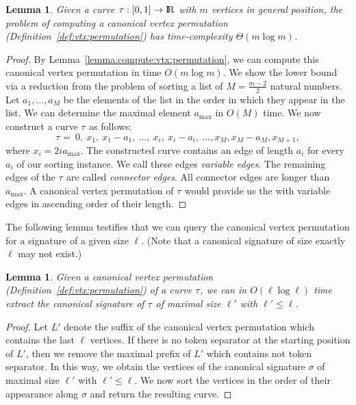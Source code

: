 \documentclass[11pt, letter]{article}
\newtheorem{lemma}[theorem]{Lemma}
\newcommand{\lemlab}[1]{\label{lemma:#1}}
\newcommand{\lemref}[1]{Lemma~\ref{lemma:#1}}
\newcommand{\defref}[1]{Definition~\ref{def:#1}}
\renewcommand{\Re}{{\rm I\!\hspace{-0.025em} R}}
\newcommand{\trajectory}[2]{\ensuremath{{#1}_{#2}}}
\newcommand{\inputSym}{\ensuremath{\tau}}
\newcommand{\inputTraj}[1]{\trajectory{\inputSym}{#1}}
\begin{document}
\begin{lemma}\lemlab{lb:vtx:permutation}
Given a curve $\tau:[0,1]\rightarrow\Re$ with $m$ vertices
in general position, the problem of computing a canonical vertex permutation (\defref{vtx:permutation}) has time-complexity $\Theta(m\log m)$.
\end{lemma}
\begin{proof}
By \lemref{compute:vtx:permutation}, we can compute this canonical vertex permutation in time $O(m \log m)$.  We show the lower bound via a reduction from the problem of sorting a list of $M=\frac{m-2}{2}$ natural numbers. Let $a_1,\dots,a_{M}$ be the elements of the list in the order in which they appear in the list. We can determine the maximal element $a_{\max}$ in $O(M)$ time. We now construct a curve $\inputTraj{}$ as follows: \[ \inputTraj{} =~ 0,~  x_1,~ x_1-a_1,~ \dots,~ x_i,~ x_i-a_i,~ \dots, x_M, x_M-a_M, x_{M+1},  \] where $x_i=2ia_{\max}$. The constructed curve contains an edge of length $a_i$ for every $a_i$ of our sorting instance. We call these edges \emph{variable edges}. The remaining edges of the $\inputTraj{}$ are called \emph{connector edges}. All connector edges are longer than $a_{\max}$. A canonical vertex permutation of $\inputTraj{}$ would provide us the with variable edges in ascending order of their length. 
\end{proof}

The following lemma testifies that we can query the canonical vertex permutation for a signature of a given size $\ell$. (Note that a canonical signature of size
exactly $\ell$ may not exist.)

\begin{lemma}\lemlab{extract:signature}
Given a canonical vertex permutation (\defref{vtx:permutation}) of a curve $\inputTraj{}$, we can in $O(\ell \log \ell)$ time extract the canonical signature of $\inputTraj{}$ of maximal size $\ell'$ with $\ell'\leq \ell$.
\end{lemma}
\begin{proof}
Let $L'$ denote the suffix of the canonical vertex permutation which contains the last $\ell$ vertices. If there is no token separator at the starting position of $L'$, then we remove the maximal prefix of $L'$ which contains not token separator. In this way, we obtain the vertices of the canonical signature $\sigma$ of maximal size $\ell'$ with $\ell'\leq \ell$. We now sort the vertices in the order of their appearance along $\sigma$ and return the resulting curve.
\end{proof}
\end{document}
